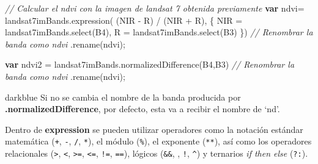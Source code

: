 \documentclass[
  12pt,
  letterpaper,
  twoside]{book}
\newenvironment{Shaded}{\begin{snugshade}}{\end{snugshade}}
\newcommand{\CommentTok}[1]{\textcolor[rgb]{0.24,0.58,0.00}{\textit{#1}}}
\newcommand{\FunctionTok}[1]{\textcolor[rgb]{0.48,0.12,0.64}{#1}}
\newcommand{\KeywordTok}[1]{\textcolor[rgb]{0.00,0.00,0.00}{\textbf{#1}}}
\newcommand{\NormalTok}[1]{#1}
\newcommand{\OperatorTok}[1]{\textcolor[rgb]{0.00,0.00,0.00}{#1}}
\newcommand{\StringTok}[1]{\textcolor[rgb]{0.87,0.29,0.22}{#1}}
\newcommand\boldpurple[1]{\textcolor{darkpurple}{\textbf{#1}}}
\begin{document}
\begin{Shaded}
\begin{Highlighting}[]
\CommentTok{// Calcular el ndvi con la imagen de landsat 7 obtenida previamente}
\KeywordTok{var}\NormalTok{ ndvi}\OperatorTok{=}\NormalTok{ landsat7imBands}\OperatorTok{.}\FunctionTok{expression}\NormalTok{( }\StringTok{\textquotesingle{}(NIR {-} R) / (NIR + R)\textquotesingle{}}\OperatorTok{,}\NormalTok{ \{}
  \StringTok{\textquotesingle{}NIR\textquotesingle{}} \OperatorTok{=}\NormalTok{ landsat7imBands}\OperatorTok{.}\FunctionTok{select}\NormalTok{(}\StringTok{\textquotesingle{}B4\textquotesingle{}}\NormalTok{)}\OperatorTok{,}
  \StringTok{\textquotesingle{}R\textquotesingle{}} \OperatorTok{=}\NormalTok{ landsat7imBands}\OperatorTok{.}\FunctionTok{select}\NormalTok{(}\StringTok{\textquotesingle{}B3\textquotesingle{}}\NormalTok{)}
\NormalTok{\})}
  \CommentTok{// Renombrar la banda como \textquotesingle{}ndvi\textquotesingle{}}
  \OperatorTok{.}\FunctionTok{rename}\NormalTok{(}\StringTok{\textquotesingle{}ndvi\textquotesingle{}}\NormalTok{)}\OperatorTok{;}
  
\KeywordTok{var}\NormalTok{ ndvi2 }\OperatorTok{=}\NormalTok{ landsat7imBands}\OperatorTok{.}\FunctionTok{normalizedDifference}\NormalTok{(}\StringTok{\textquotesingle{}B4\textquotesingle{}}\OperatorTok{,}\StringTok{\textquotesingle{}B3\textquotesingle{}}\NormalTok{)}
  \CommentTok{// Renombrar la banda como \textquotesingle{}ndvi\textquotesingle{}}
  \OperatorTok{.}\FunctionTok{rename}\NormalTok{(}\StringTok{\textquotesingle{}ndvi\textquotesingle{}}\NormalTok{)}\OperatorTok{;}
\end{Highlighting}
\end{Shaded}

\begin{bluebox2}

\begin{awesomeblock}{5pt}{\faLightbulb}{darkblue}
Si no se cambia el nombre de la banda producida por \boldpurple{.normalizedDifference}, por defecto, esta va a recibir el nombre de `nd'.

\end{awesomeblock}

\end{bluebox2}

Dentro de \boldpurple{expression} se pueden utilizar operadores como la notación estándar matemática (\texttt{+}, \texttt{-}, \texttt{/}, \texttt{*}), el módulo (\texttt{\%}), el exponente (\texttt{**}), así como los operadores relacionales (\texttt{\textgreater{}}, \texttt{\textless{}}, \texttt{\textgreater{}=}, \texttt{\textless{}=}, \texttt{!=}, \texttt{==}), lógicos (\texttt{\&\&}, \texttt{\textbar{}\textbar{}}, \texttt{!}, \texttt{\^{}}) y ternarios \emph{if then else} (\texttt{?:}).
\end{document}
